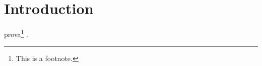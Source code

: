 \documentclass[../main.tex]{subfiles}
\begin{document}
\section{Introduction}\label{sec:intro}
prova\footnote{This is a footnote.} \cite{alexakis}.
\end{document}
